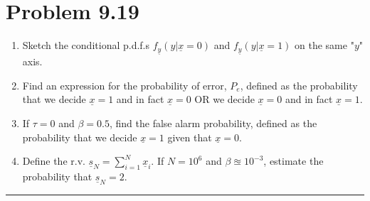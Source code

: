 \documentclass{article}
\newcommand{\horline}
           {\begin{center}
              \noindent\rule{8cm}{0.4pt}
            \end{center}}
\begin{document}
\section*{Problem 9.19}
\begin{enumerate}[label=(\roman*)]
  \item{Sketch the conditional p.d.f.s 
        $f_{\underline{y}}(y | \underline{x} = 0)$ and
        $f_{\underline{y}}(y | \underline{x} = 1)$ on the same "$y$" axis.
       }
  \item{Find an expression for the probability of error, $P_e$, defined as
        the probability that we decide $\underline{x} = 1$ and in fact 
        $\underline{x} = 0$ OR we decide $\underline{x} = 0$ and in fact
        $\underline{x} = 1$.}
  \item{If $\tau = 0$ and $\beta = 0.5$, find the false alarm probability,
        defined as the probability that we decide $\underline{x} = 1$ given
        that $\underline{x} = 0$.}
  \item{Define the r.v. $\underline{s}_N = \sum_{i=1}^N \underline{x}_i$. If
        $N = 10^6$ and $\beta \approxeq 10^{-3}$, estimate the probability
        that $\underline{s}_N = 2$.}
\end{enumerate}
\horline
\end{document}
